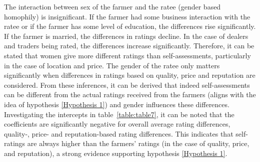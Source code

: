 \documentclass[12pt,english]{article}\usepackage[]{graphicx}\usepackage[]{color}
\begin{document}
The interaction between sex of the farmer and the ratee (gender based
homophily) is insignificant. If the farmer had some business interaction
with the ratee or if the farmer has some level of education, the differences
rise significantly. If the farmer is married, the differences in ratings
decline. In the case of dealers and traders being rated, the differences
increase significantly. Therefore, it can be stated that women give
more different ratings than self-assessments, particularly in the
case of location and price. The gender of the ratee only matters significantly
when differences in ratings based on quality, price and reputation
are considered. From these inferences, it can be derived that indeed
self-assessments can be different from the actual ratings received
from the farmers (aligns with the idea of hypothesis \ref{Hypothesis 1})
and gender influences these differences. Investigating the intercepts
in table~\ref{table:table7}, it can be noted that the coefficients
are significantly negative for overall average rating differences,
quality-, price- and reputation-based rating differences. This indicates
that self-ratings are always higher than the farmers' ratings (in
the case of quality, price, and reputation), a strong evidence supporting
hypothesis \ref{Hypothesis 1}. 
\end{document}
